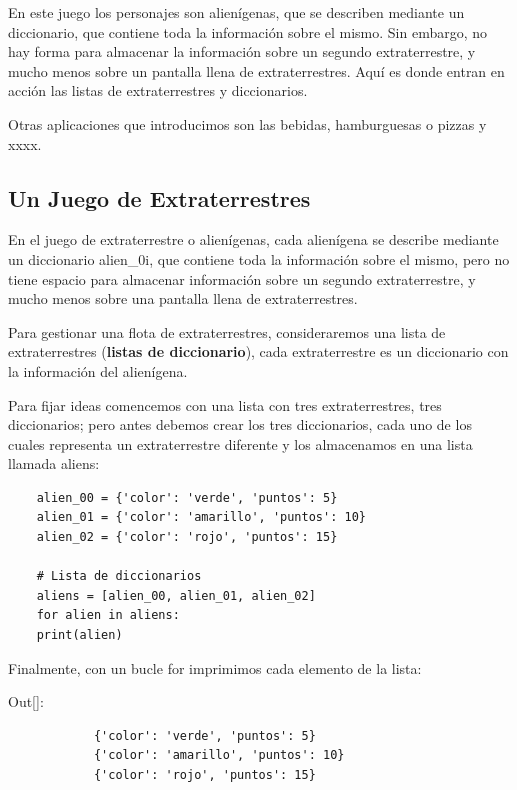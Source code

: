 En este juego los personajes son alienígenas, que se describen mediante un diccionario, que contiene toda la información sobre el mismo.  Sin embargo, no hay forma para almacenar la información sobre un segundo extraterrestre, y mucho menos sobre un pantalla llena de extraterrestres.  Aquí es donde entran en acción las listas de extraterrestres y diccionarios.

Otras aplicaciones que introducimos son las bebidas, hamburguesas o pizzas y xxxx.




\subsection{Un Juego de Extraterrestres}

En el juego de extraterrestre o alienígenas,  cada alienígena se describe mediante un diccionario {\ttfamily alien\_0i}, que contiene toda la información sobre el mismo, pero no tiene espacio para almacenar información sobre un segundo extraterrestre, y mucho menos sobre una pantalla llena de extraterrestres. 

Para gestionar una flota de extraterrestres, consideraremos una lista de extraterrestres ({\bf listas de diccionario}),  cada extraterrestre es un diccionario con  la información del alienígena.

Para fijar ideas comencemos con una lista con tres extraterrestres, tres diccionarios; pero antes debemos  crear los tres diccionarios, cada uno de los cuales representa un extraterrestre diferente y los almacenamos en una lista llamada {\ttfamily aliens}:

\hspace{-2.5cm}{\ttfamily \scriptsize aliens.py}  \vspace{-0.5cm}
\begin{lstlisting}
	alien_00 = {'color': 'verde', 'puntos': 5}
	alien_01 = {'color': 'amarillo', 'puntos': 10}
	alien_02 = {'color': 'rojo', 'puntos': 15}
	
	# Lista de diccionarios
	aliens = [alien_00, alien_01, alien_02]
	for alien in aliens:
	print(alien)
\end{lstlisting}

Finalmente, con un bucle {\ttfamily for} imprimimos cada  elemento de la lista:

{\ttfamily\scriptsize\scriptsize \noindent Out[]: \vspace{-0.3cm}	
	{\color{blue} 	
		\begin{verbatim}
			{'color': 'verde', 'puntos': 5}
			{'color': 'amarillo', 'puntos': 10}
			{'color': 'rojo', 'puntos': 15}			
		\end{verbatim}
}}

